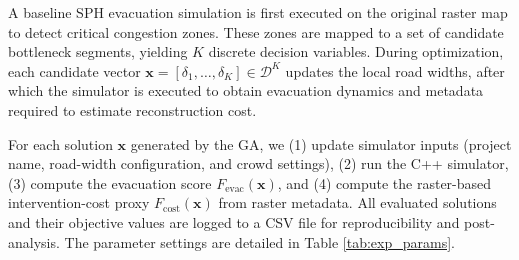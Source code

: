 \documentclass[preprint,12pt]{elsarticle}
\begin{document}
A baseline SPH evacuation simulation is first executed on the original raster map to detect critical congestion zones. These zones are mapped to a set of candidate bottleneck segments, yielding
$K$ discrete decision variables. During optimization, each candidate vector
$\boldsymbol{x}=[\delta_1,\dots,\delta_K]\in\mathcal{D}^K$ updates the local road widths, after which the simulator is
executed to obtain evacuation dynamics and metadata required to estimate reconstruction cost.



For each solution $\boldsymbol{x}$ generated by the GA, we (1) update simulator inputs (project name,
road-width configuration, and crowd settings), (2) run the C++ simulator, (3) compute the evacuation score
$F_{\mathrm{evac}}(\boldsymbol{x})$, and (4) compute the raster-based intervention-cost proxy
$F_{\mathrm{cost}}(\boldsymbol{x})$ from raster metadata. All evaluated solutions and their objective values are logged
to a CSV file for reproducibility and post-analysis.
The parameter settings are detailed in Table \ref{tab:exp_params}.
\end{document}
